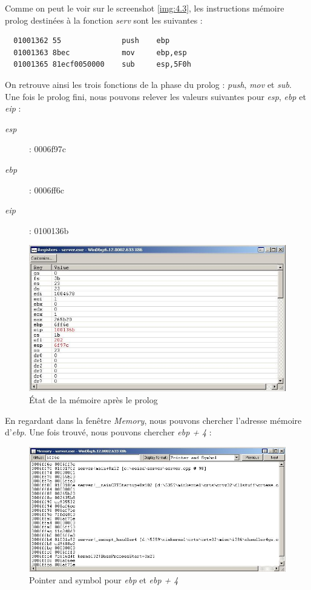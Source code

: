 Comme on peut le voir sur le screenshot \ref{img:4.3}, les instructions mémoire prolog destinées à la fonction \textit{serv} sont les suivantes :
\begin{verbatim}
  01001362 55              push    ebp
  01001363 8bec            mov     ebp,esp
  01001365 81ecf0050000    sub     esp,5F0h
\end{verbatim}
On retrouve ainsi les trois fonctions de la phase du prolog : \textit{push}, \textit{mov} et \textit{sub}.\\
Une fois le prolog fini, nous pouvons relever les valeurs suivantes pour \textit{esp}, \textit{ebp} et \textit{eip} :
\begin{description}
 \item[\textit{esp}] : 0006f97c
 \item[\textit{ebp}] : 0006ff6c
 \item[\textit{eip}] : 0100136b
\end{description}
\begin{figure}[H]
 \centering
 \includegraphics[width=.9\textwidth]{img/42.JPG}
 \caption{État de la mémoire après le prolog}
 \label{img:42}
\end{figure}
En regardant dans la fenêtre \textit{Memory}, nous pouvons chercher l'adresse mémoire d'\textit{ebp}. Une fois trouvé, nous pouvons chercher \textit{ebp + 4} :
\begin{figure}[H]
 \centering
 \includegraphics[width=.9\textwidth]{img/43.JPG}
 \caption{Pointer and symbol pour \textit{ebp} et \textit{ebp + 4}}
 \label{img:43}
\end{figure}
